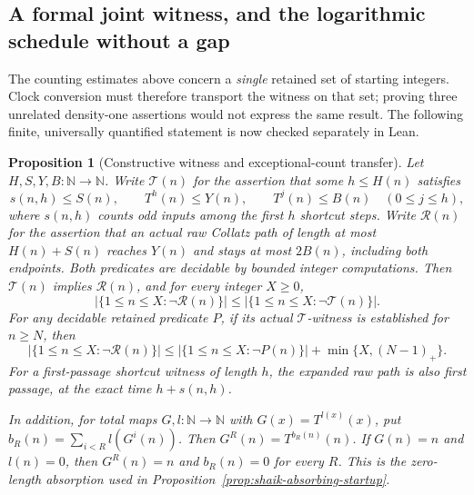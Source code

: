 \documentclass[11pt]{article}
\newtheorem{proposition}{Proposition}
\theoremstyle{remark}\newtheorem{remark}[proposition]{Remark}
\newcommand{\NN}{\mathbb N}
\begin{document}
\subsection{A formal joint witness, and the logarithmic schedule without a gap}

The counting estimates above concern a \emph{single} retained set of
starting integers. Clock conversion must therefore transport the
witness on that set; proving three unrelated density-one assertions
would not express the same result. The following finite, universally
quantified statement is now checked separately in Lean.

\begin{proposition}[Constructive witness and exceptional-count transfer]
\label{prop:shaik-joint-certificate}
Let \(H,S,Y,B:\NN\to\NN\). Write \(\mathcal T(n)\) for the assertion
that some \(h\le H(n)\) satisfies
\[
 s(n,h)\le S(n),\qquad T^h(n)\le Y(n),\qquad
 T^j(n)\le B(n)\quad(0\le j\le h),
\]
where \(s(n,h)\) counts odd inputs among the first \(h\) shortcut
steps. Write \(\mathcal R(n)\) for the assertion that an actual
raw Collatz path of length at most \(H(n)+S(n)\) reaches \(Y(n)\)
and stays at most \(2B(n)\), including both endpoints.
Both predicates are decidable by bounded integer computations.
Then \(\mathcal T(n)\) implies \(\mathcal R(n)\), and for every
integer \(X\ge0\),
\begin{equation}\label{eq:shaik-joint-count}
 |\{1\le n\le X:\neg\mathcal R(n)\}|
 \le|\{1\le n\le X:\neg\mathcal T(n)\}|.
\end{equation}
For any decidable retained predicate \(P\), if its actual
\(\mathcal T\)-witness is established for \(n\ge N\), then
\begin{equation}\label{eq:shaik-joint-startup}
 |\{1\le n\le X:\neg\mathcal R(n)\}|
 \le|\{1\le n\le X:\neg P(n)\}|+\min\{X,(N-1)_+\}.
\end{equation}
For a first-passage shortcut witness of length \(h\), the expanded raw
path is also first passage, at the exact time \(h+s(n,h)\).

In addition, for total maps \(G,l:\NN\to\NN\) with
\(G(x)=T^{l(x)}(x)\), put
\(b_R(n)=\sum_{i<R}l(G^i(n))\). Then
\(G^R(n)=T^{b_R(n)}(n)\).
If \(G(n)=n\) and \(l(n)=0\), then \(G^R(n)=n\) and \(b_R(n)=0\)
for every \(R\). This is the zero-length absorption used in
Proposition~\ref{prop:shaik-absorbing-startup}.
\end{proposition}
\end{document}
